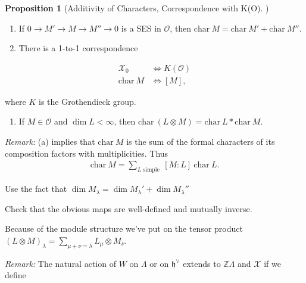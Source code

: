 \documentclass[11pt]{scrartcl}
\theoremstyle{definition}
\theoremstyle{theorem}
\newtheorem{proposition}[theorem]{Proposition}
\theoremstyle{proof}
\newenvironment{proof}
{\pushQED{$\qed$}\pf}
{\par\popQED\endpf}
\theoremstyle{definition}
\theoremstyle{break}
\theoremstyle{problem}
\providecommand{\tightlist}{%
  \setlength{\itemsep}{0pt}\setlength{\parskip}{0pt}}
\newcommand{\ZZ}[0]{{\mathbb{Z}}}
\newcommand{\ch}[0]{\mathrm{char}~}
\newcommand{\dual}[0]{^\vee}
\newcommand{\lieh}[0]{{\mathfrak{h}}}
\newcommand{\OO}[0]{{\mathcal{O}}}
\newcommand{\mcx}[0]{{\mathcal{X}}}
\newcommand{\tensor}[0]{\otimes}
\renewcommand{\qed}[0]{\hfill\blacksquare}
\renewcommand{\to}[0]{\longrightarrow}
\begin{document}
\begin{proposition}[Additivity of Characters, Correspondence with K(O] )

\hfill

\begin{enumerate}
\def\labelenumi{\alph{enumi}.}
\item
  If \(0 \to M' \to M \to M'' \to 0\) is a SES in \(\OO\), then
  \(\ch M = \ch M' + \ch M''\).
\item
  There is a 1-to-1 correspondence
\end{enumerate}

\begin{align*}
\mcx_0 &\iff K(\OO) \\
\ch M &\iff [M]
,\end{align*}

where \(K\) is the Grothendieck group.

\begin{enumerate}
\def\labelenumi{\alph{enumi}.}
\setcounter{enumi}{2}
\tightlist
\item
  If \(M\in \OO\) and \(\dim L < \infty\), then
  \(\ch(L\tensor M) = \ch L \ast \ch M\).
\end{enumerate}

\end{proposition}

\emph{Remark:} (a) implies that \(\ch M\) is the sum of the formal
characters of its composition factors with multiplicities. Thus
\begin{align*}
\ch M = \sum_{L \text{ simple }} [M:L] ~\ch L
.\end{align*}

\begin{proof}[of a]

Use the fact that
\(\dim M_\lambda = \dim M_\lambda' + \dim M_\lambda''\)\end{proof}

\begin{proof}[of b]

Check that the obvious maps are well-defined and mutually
inverse.\end{proof}

\begin{proof}[of c]

Because of the module structure we've put on the tensor product
\((L \tensor M)_\lambda = \sum_{\mu + \nu = \lambda} L_\mu \tensor M_\nu\).\end{proof}

\emph{Remark:} The natural action of \(W\) on \(\Lambda\) or on
\(\lieh\dual\) extends to \(\ZZ \Lambda\) and \(\mcx\) if we define
\end{document}
